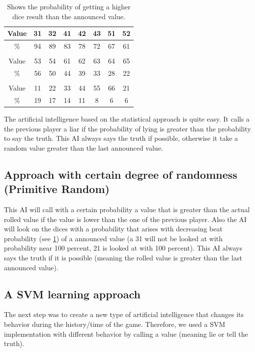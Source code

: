 \documentclass[11pt]{article}
\begin{document}
\begin{table}[H]
	\centering
	\small 
	\begin{tabular}{|c|c|c|c|c|c|c|c|}
		\hline 
		Value&31&32&41&42&43&51&52\\ \hline
		\%&94&89&83&78&72&67&61\\ \hline 
		&&&&&&& \\ \hline
		Value&53&54&61&62&63&64&65\\ \hline
		\%&56&50&44&39&33&28&22\\ \hline 
		&&&&&&& \\ \hline
		Value&11&22&33&44&55&66&21\\ \hline
		\%&19&17&14&11&8&6&6 \\ \hline
				
	\end{tabular}
	\caption{Shows the probability of getting a higher dice result than the announced value.}
	\label{tbl:stat1}
\end{table}

The artificial intelligence based on the statistical approach is quite easy. It calls a the previous player a liar if the probability of lying is greater than the probability to say the truth.
This AI always says the truth if possible, otherwise it take a random value greater than the last announced value.


\subsection{Approach with certain degree of randomness (Primitive Random)}
\label{ssec:primitive}
This AI will call with a certain probability a value that is greater than the actual rolled value if the value is lower than the one of the previous player. Also the AI will look on the dices with a probability that arises with decreasing beat probability (see \cref{tbl:stat1}) of a announced value (a 31 will not be looked at with probability near 100 percent, 21 is looked at with 100 percent). This AI always says the truth if it is possible (meaning the rolled value is greater than the last announced value).

\subsection{A SVM learning approach}
The next step was to create a new type of artificial intelligence that changes its behavior during the history/time of the game.
Therefore, we used a SVM implementation with different behavior by calling a value (meaning lie or tell the truth).
\end{document}
